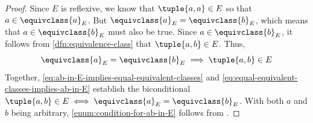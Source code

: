 \begin{proof}
    Since \( E \) is reflexive, we know that \( \tuple{a,a} \in E \) so that \( a \in \equivclass{a}_{E} \).
    But \( \equivclass{a}_{E} = \equivclass{b}_{E} \), which means that \( a \in \equivclass{b}_{E} \) must also be true.
    Since \( a \in \equivclass{b}_{E} \), it follows from \cref{dfn:equivalence-class} that \( \tuple{a,b} \in E \). Thus,
    \begin{equation}
        \label{eq:equal-equivalent-classes-implies-ab-in-E}
        \equivclass{a}_{E} = \equivclass{b}_{E} \implies \tuple{a,b} \in E
    \end{equation}
    Together, \eqref{eq:ab-in-E-implies-equal-equivalent-classes} and \eqref{eq:equal-equivalent-classes-implies-ab-in-E}
    establish the biconditional \( \tuple{a,b} \in E \iff \equivclass{a}_{E} = \equivclass{b}_{E} \). With both \( a \) and
    \( b \) being arbitrary, \ref{enum:condition-for-ab-in-E} follows from .


\end{proof}
